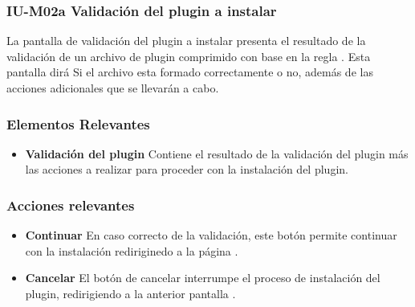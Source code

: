 
\subsubsection{IU-M02a Validación del plugin a instalar}

 La pantalla de validación del plugin a instalar presenta el resultado de la validación de un
 archivo de plugin comprimido con base en la regla . Esta pantalla dirá Si el archivo
 esta formado correctamente o no, además de las acciones adicionales que se llevarán a cabo.


\subsubsection{Elementos Relevantes}

    \begin{itemize}
    \item {\bf Validación del plugin}
        Contiene el resultado de la validación del plugin más las acciones
        a realizar para proceder con la instalación del plugin.

    \end{itemize}

\subsubsection{Acciones relevantes}

    \begin{itemize}
    \item {\bf Continuar}
        En caso correcto de la validación, este botón permite continuar con la instalación
        rediriginedo a la página .

    \item {\bf Cancelar}
        El botón de cancelar interrumpe el proceso de instalación del plugin, redirigiendo
        a la anterior pantalla .
    \end{itemize}

\clearpage

